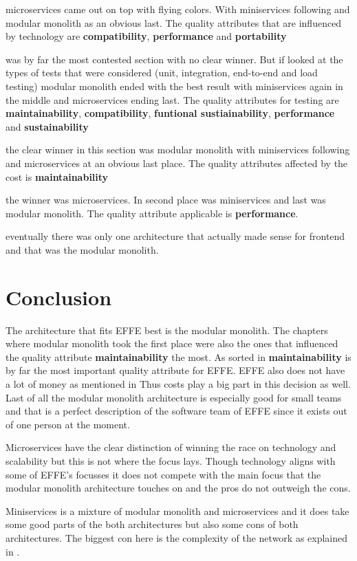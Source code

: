  microservices came out on top with flying colors. With miniservices following and modular monolith as an obvious last. The quality attributes that are influenced by technology are \textbf{compatibility}, \textbf{performance} and \textbf{portability}

 was by far the most contested section with no clear winner. But if looked at the types of tests that were considered (unit, integration, end-to-end and load testing) modular monolith ended with the best result with miniservices again in the middle and microservices ending last. The quality attributes for testing are \textbf{maintainability}, \textbf{compatibility}, \textbf{funtional sustiainability}, \textbf{performance} and \textbf{sustainability}

 the clear winner in this section was modular monolith with miniservices following and microservices at an obvious last place. The quality attributes affected by the cost is \textbf{maintainability}

 the winner was microservices. In second place was miniservices and last was modular monolith. The quality attribute applicable is \textbf{performance}.

 eventually there was only one architecture that actually made sense for frontend and that was the modular monolith.

\section{Conclusion}

The architecture that fits EFFE best is the modular monolith. The chapters where modular monolith took the first place were also the ones that influenced the quality attribute \textbf{maintainability} the most. As sorted in  \textbf{maintainability} is by far the most important quality attribute for EFFE. EFFE also does not have a lot of money as mentioned in  Thus costs play a big part in this decision as well. Last of all the modular monolith architecture is especially good for small teams and that is a perfect description of the software team of EFFE since it exists out of one person at the moment.

Microservices have the clear distinction of winning the race on technology and scalability but this is not where the focus lays. Though technology aligns with some of EFFE's focusses it does not compete with the main focus that the modular monolith architecture touches on and the pros do not outweigh the cons.

Miniservices is a mixture of modular monolith and microservices and it does take some good parts of the both architectures but also some cons of both architectures. The biggest con here is the complexity of the network as explained in .
